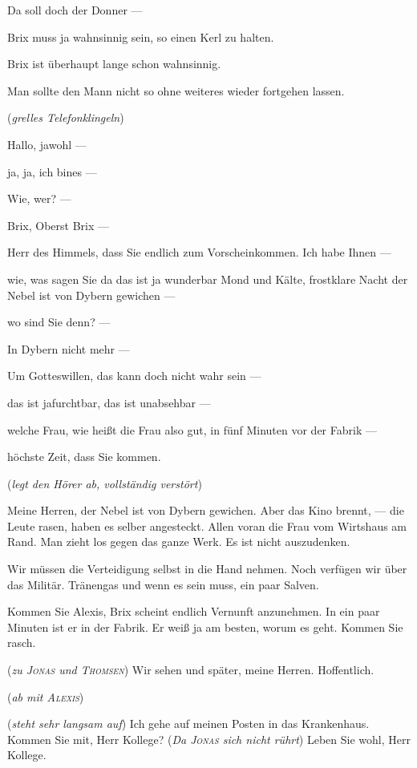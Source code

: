 \documentclass[
	final,
	a4paper,
	ngerman,
	mpinclude = true, %
	twoside = true,
	open = right,
	cleardoublepage = plain,
	DIV = 13,
	BCOR = 1cm,
	titlepage = firstiscover,
	]{scrbook}
\newcommand{\direction}[1]{(\textit{#1})}
\newcommand{\thecharacter}[1]{\textup{\textsc{#1}}\xspace}
\newcommand{\theAlexis}{\thecharacter{Alexis}}
\newcommand{\theThomsen}{\thecharacter{Thomsen}}
\newcommand{\theJonas}{\thecharacter{Jonas}}
\newcommand{\character}[1]{\item[#1]}
\newcommand{\Generaldirektor}{\character{Direktor}}
\newcommand{\Alexis}{\character{\theAlexis}}
\newcommand{\Thomsen}{\character{\theThomsen}}
\newcommand{\Jonas}{\character{\theJonas}}
\begin{document}
\begin{play}
\Alexis
Da soll doch der Donner ---

\Generaldirektor
Brix muss ja wahnsinnig sein, so einen Kerl zu halten.

\Jonas
Brix ist überhaupt lange schon wahnsinnig.

\Thomsen
Man sollte den Mann nicht so ohne weiteres wieder fortgehen lassen. 

\direction{grelles Telefonklingeln}


\Generaldirektor
Hallo, jawohl --- 

ja, ja, ich bines --- 

Wie, wer? --- 

Brix, Oberst Brix --- 

Herr des Himmels, dass Sie endlich zum Vorscheinkommen. Ich habe Ihnen ---

wie, was sagen Sie da das ist ja wunderbar Mond und Kälte, frostklare Nacht der Nebel ist von Dybern gewichen ---

wo sind Sie denn? ---

In Dybern nicht mehr ---

Um Gotteswillen, das kann doch nicht wahr sein ---

das ist jafurchtbar, das ist unabsehbar ---

welche Frau, wie heißt die Frau also gut, in fünf Minuten vor der Fabrik ---

höchste Zeit, dass Sie kommen.

\direction{legt den Hörer ab, vollständig verstört}

Meine Herren, der Nebel ist von Dybern gewichen. Aber das Kino brennt, --- die Leute rasen, haben es selber angesteckt. Allen voran die Frau vom Wirtshaus am Rand. Man zieht los gegen das ganze Werk. Es ist nicht auszudenken.

\Alexis
Wir müssen die Verteidigung selbst in die Hand nehmen. Noch verfügen wir über das Militär. Tränengas und wenn es sein muss, ein paar Salven.

\Generaldirektor
Kommen Sie Alexis, Brix scheint endlich Vernunft anzunehmen. In ein paar Minuten ist er in der Fabrik. Er weiß ja am besten, worum es geht. Kommen Sie rasch.

\direction{zu \theJonas und \theThomsen} Wir sehen und später, meine Herren. Hoffentlich. 

\direction{ab mit \theAlexis}


\Thomsen
\direction{steht sehr langsam auf} Ich gehe auf meinen Posten in das Krankenhaus. Kommen Sie mit, Herr Kollege? \direction{Da \theJonas sich nicht rührt} Leben Sie wohl, Herr Kollege.


\end{play}
\end{document}
